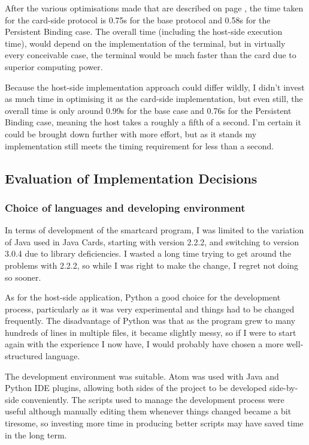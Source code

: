\documentclass[12pt,a4paper]{article}
\begin{document}
After the various optimisations made that are described on page \pageref{subsec:other_opts}, the time taken for the card-side protocol is 0.75s for the base protocol and 0.58s for the Persistent Binding case. The overall time (including the host-side execution time), would depend on the implementation of the terminal, but in virtually every conceivable case, the terminal would be much faster than the card due to superior computing power.

Because the host-side implementation approach could differ wildly, I didn't invest as much time in optimising it as the card-side implementation, but even still, the overall time is only around 0.99s for the base case and 0.76s for the Persistent Binding case, meaning the host takes a roughly a fifth of a second. I'm certain it could be brought down further with more effort, but as it stands my implementation still meets the timing requirement for less than a second.

\subsection{Evaluation of Implementation Decisions}

\subsubsection{Choice of languages and developing environment}
In terms of development of the smartcard program, I was limited to the variation of Java used in Java Cards, starting with version 2.2.2, and switching to version 3.0.4 due to library deficiencies. I wasted a long time trying to get around the problems with 2.2.2, so while I was right to make the change, I regret not doing so sooner.


As for the host-side application, Python a good choice for the development process, particularly as it was very experimental and things had to be changed frequently. The disadvantage of Python was that as the program grew to many hundreds of lines in multiple files, it became slightly messy, so if I were to start again with the experience I now have, I would probably have chosen a more well-structured language.

The development environment was suitable. Atom was used with Java and Python IDE plugins, allowing both sides of the project to be developed side-by-side conveniently. The scripts used to manage the development process were useful although manually editing them whenever things changed became a bit tiresome, so investing more time in producing better scripts may have saved time in the long term.
\end{document}
